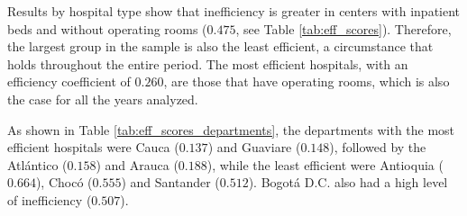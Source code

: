 \documentclass[11pt,a4paper,oneside]{article}
\begin{document}



Results by hospital type show that inefficiency is greater in centers with inpatient beds and without operating rooms ($0.475$, see Table \ref{tab:eff_scores}). Therefore, the largest group in the sample is also the least efficient, a circumstance that holds throughout the entire period. The most efficient hospitals, with an efficiency coefficient of $0.260$, are those that have operating rooms, which is also the case for all the years analyzed.


\color{black}




As shown in Table \ref{tab:eff_scores_departments}, the departments with the most efficient hospitals were Cauca ($0.137$) and Guaviare ($0.148$), followed by the Atl\'antico ($0.158$) and Arauca ($0.188$), while the least efficient were Antioquia ($0.664$), Choc\'o ($0.555$) and Santander ($0.512$). Bogot\'a D.C. also had a high level of inefficiency ($0.507$).



\end{document}
